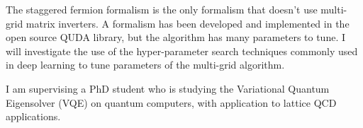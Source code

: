 The staggered fermion formalism is the only formalism that
doesn't use multi-grid matrix inverters. A formalism has been developed
and implemented in the open source QUDA library, but the algorithm has
many parameters to tune. I will investigate the use of the
hyper-parameter search techniques commonly used in deep learning to tune
parameters of the multi-grid algorithm.

I am supervising a PhD student who is studying the Variational
Quantum Eigensolver (VQE) on quantum computers, with application
to lattice QCD applications.


